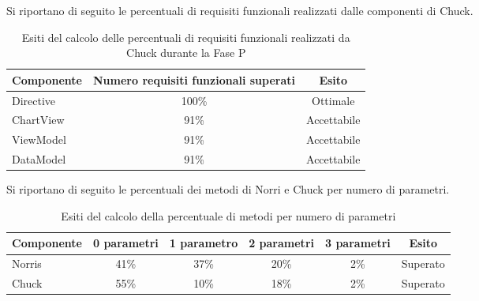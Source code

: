 Si riportano di seguito le percentuali di requisiti funzionali realizzati dalle componenti di Chuck.
\begin{table}[H]
	\centering
		\begin{tabu}{| l | c | c |}
			\hline
			Componente	& Numero requisiti funzionali superati	& Esito		\\ \hline \hline
			Directive	& 100\% 	& Ottimale  \\ \hline
			ChartView  & 	91\%	& Accettabile  \\ \hline
			ViewModel  & 	91\%	& Accettabile  \\ \hline
			DataModel  & 	91\%	& Accettabile  \\ \hline
		\end{tabu}
	\caption{Esiti del calcolo delle percentuali di requisiti funzionali realizzati da Chuck durante la Fase P}
\end{table}

Si riportano di seguito le percentuali dei metodi di Norri e Chuck per numero di parametri.
\begin{table}[H]
	\centering
		\begin{tabu}{| l | c | c | c | c | c |}
			\hline
			Componente	& 0 parametri & 1 parametro & 2 parametri & 3 parametri & Esito		\\ \hline \hline
			Norris	& 41\% & 37\% & 20\% & 2\%	& Superato  \\ \hline
			Chuck  & 55\% & 10\% & 18\% & 2\%	& Superato  \\ \hline
		\end{tabu}
	\caption{Esiti del calcolo della percentuale di metodi per numero di parametri}
\end{table}



